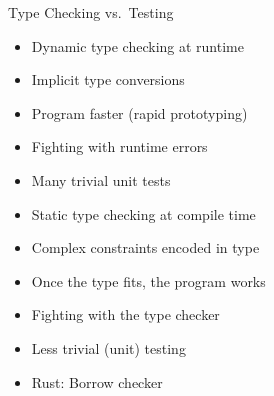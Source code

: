 
\begin{Frame}{Type Checking vs.~Testing}
  \begin{itemize}
    \item Dynamic type checking at runtime
    \item Implicit type conversions
    \item Program faster (rapid prototyping)
    \item Fighting with runtime errors
    \item Many trivial unit tests
  \end{itemize}

  \xxx

  \begin{itemize}
    \item Static type checking at compile time
    \item Complex constraints encoded in type
    \item Once the type fits, the program works
    \item Fighting with the type checker
    \item Less trivial (unit) testing
    \item \alert{Rust: Borrow checker}
  \end{itemize}
\end{Frame}
  
